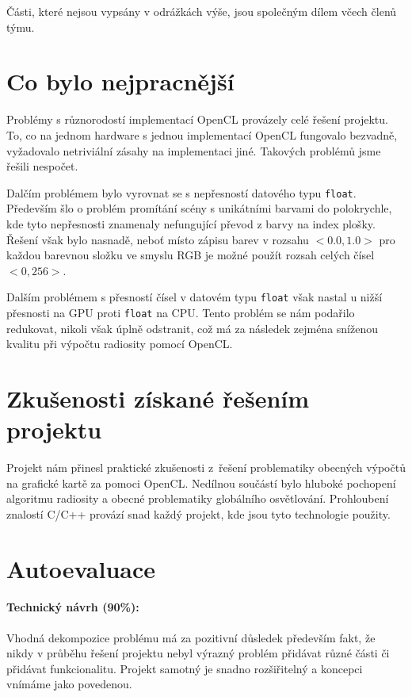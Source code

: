 \documentclass[11pt,a4paper]{article}
\begin{document}
Části, které nejsou vypsány v odrážkách výše, jsou společným dílem včech členů týmu.

\section{Co bylo nejpracnější}
Problémy s různorodostí implementací OpenCL provázely celé řešení projektu. To, co na jednom hardware s jednou implementací OpenCL fungovalo bezvadně, vyžadovalo netriviální zásahy na implementaci jiné. Takových problémů jsme řešili nespočet.

Dalčím problémem bylo vyrovnat se s nepřesností datového typu \texttt{float}. Především šlo o problém promítání scény s unikátními barvami do polokrychle, kde tyto nepřesnosti znamenaly nefungující převod z barvy na index plošky. Řešení však bylo nasnadě, neboť místo zápisu barev v rozsahu $<0.0,1.0>$ pro každou barevnou složku ve smyslu RGB je možné použít rozsah celých čísel $<0,256>$.

Dalším problémem s přesností čísel v datovém typu \texttt{float} však nastal u nižší přesnosti na GPU proti \texttt{float} na CPU. Tento problém se nám podařilo redukovat, nikoli však úplně odstranit, což má za následek zejména sníženou kvalitu při výpočtu radiosity pomocí OpenCL.

\section{Zkušenosti získané řešením projektu}
Projekt nám přinesl praktické zkušenosti z~řešení problematiky obecných výpočtů na grafické kartě za pomoci OpenCL. Nedílnou součástí bylo hluboké pochopení algoritmu radiosity a obecné problematiky globálního osvětlování. Prohloubení znalostí C/C++ provází snad každý projekt, kde jsou tyto technologie použity.

\section{Autoevaluace}
\paragraph{Technický návrh (90\%):} 
Vhodná dekompozice problému má za pozitivní důsledek především fakt, že nikdy v průběhu řešení projektu nebyl výrazný problém přidávat různé části či přidávat funkcionalitu. Projekt samotný je snadno rozšiřitelný a koncepci vnímáme jako povedenou.
\end{document}
